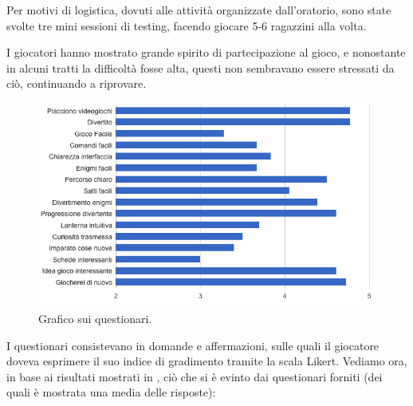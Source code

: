 Per motivi di logistica, dovuti alle attività organizzate dall'oratorio, sono state svolte tre mini sessioni di testing, facendo giocare 5-6 ragazzini alla volta.

I giocatori hanno mostrato grande spirito di partecipazione al gioco, e nonostante in alcuni tratti la difficoltà fosse alta, questi non sembravano essere stressati da ciò, continuando a riprovare.

\begin{figure}[h]
\centerline{\includegraphics[scale=0.55]{images/risultati/test_01_questionario.png}}
\caption{Grafico sui questionari.}
\label{fig:test-questionario01}
\end{figure}

I questionari consistevano in domande e affermazioni, sulle quali il giocatore doveva esprimere il suo indice di gradimento tramite la scala Likert.
Vediamo ora, in base ai risultati mostrati in \myfig{\ref{fig:test-questionario01}}, ciò che si è evinto dai questionari forniti (dei quali è mostrata una media delle risposte):

